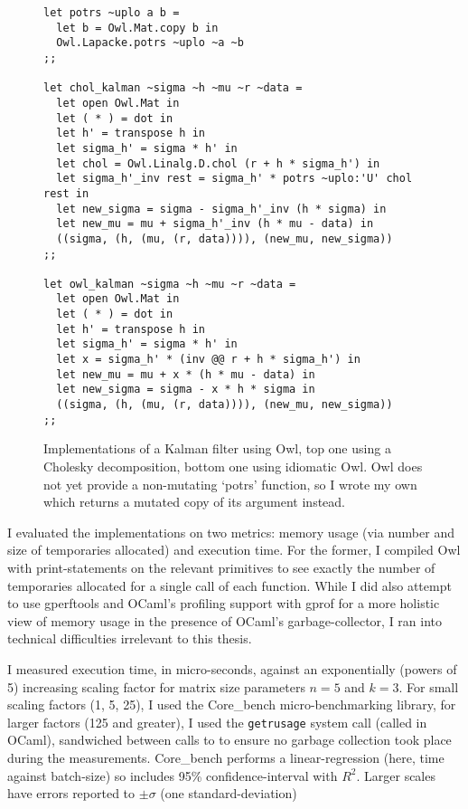 \begin{figure}[tp]
    \begin{verbatim}
let potrs ~uplo a b =
  let b = Owl.Mat.copy b in
  Owl.Lapacke.potrs ~uplo ~a ~b
;;

let chol_kalman ~sigma ~h ~mu ~r ~data =
  let open Owl.Mat in
  let ( * ) = dot in
  let h' = transpose h in
  let sigma_h' = sigma * h' in
  let chol = Owl.Linalg.D.chol (r + h * sigma_h') in
  let sigma_h'_inv rest = sigma_h' * potrs ~uplo:'U' chol rest in
  let new_sigma = sigma - sigma_h'_inv (h * sigma) in
  let new_mu = mu + sigma_h'_inv (h * mu - data) in
  ((sigma, (h, (mu, (r, data)))), (new_mu, new_sigma))
;;

let owl_kalman ~sigma ~h ~mu ~r ~data =
  let open Owl.Mat in
  let ( * ) = dot in
  let h' = transpose h in
  let sigma_h' = sigma * h' in
  let x = sigma_h' * (inv @@ r + h * sigma_h') in
  let new_mu = mu + x * (h * mu - data) in
  let new_sigma = sigma - x * h * sigma in
  ((sigma, (h, (mu, (r, data)))), (new_mu, new_sigma))
;;
    \end{verbatim}
    \caption{Implementations of a Kalman filter using Owl, top one using a
        Cholesky decomposition, bottom one using idiomatic Owl. Owl does not
        yet provide a non-mutating `potrs' function, so I wrote my own which
        returns a mutated copy of its argument instead.}\label{fig:chol_owl_kalman}

\end{figure}

I evaluated the implementations on two metrics: memory usage (via number and
size of temporaries allocated) and execution time. For the former, I compiled
Owl with print-statements on the relevant primitives to see exactly the number
of temporaries allocated for a single call of each function. While I did also
attempt to use gperftools and OCaml's profiling support with gprof for a more
holistic view of memory usage in the presence of OCaml's garbage-collector, I
ran into technical difficulties irrelevant to this thesis.

I measured execution time, in micro-seconds, against an exponentially (powers
of 5) increasing scaling factor for matrix size parameters $n=5$ and $k=3$.
For small scaling factors (1, 5, 25), I used the Core\_bench micro-benchmarking
library, for larger factors (125 and greater), I used the \texttt{getrusage}
system call (called  in OCaml), sandwiched between calls to
 to ensure no garbage collection took place during the
measurements.  Core\_bench performs a linear-regression (here, time against
batch-size) so includes 95\% confidence-interval with $R^2$. Larger scales have
errors reported to $\pm \sigma$ (one standard-deviation) 


